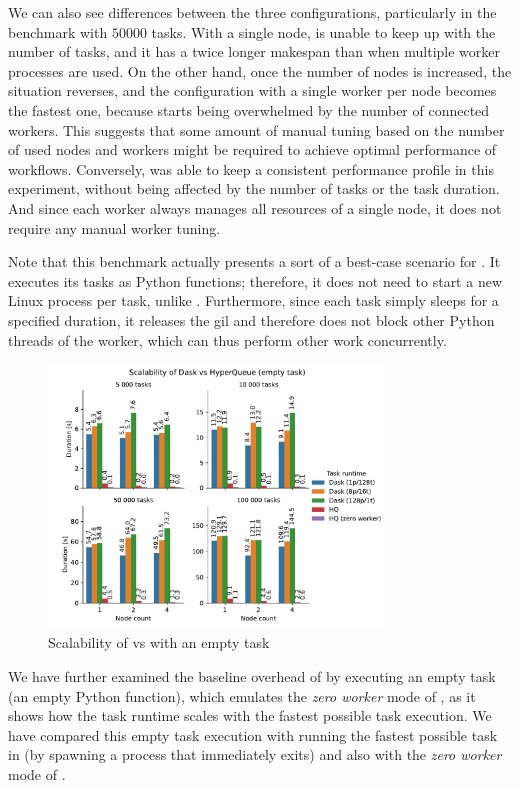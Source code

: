 We can also see differences between the three \dask{} configurations, particularly
in the benchmark with $50000$ tasks. With a single node, \dask{} is
unable to keep up with the number of tasks, and it has a twice longer makespan than when multiple
worker processes are used. On the other hand, once the number of nodes is increased, the situation
reverses, and the configuration with a single worker per node becomes the fastest one, because
\dask{} starts being overwhelmed by the number of connected workers. This suggests
that some amount of manual tuning based on the number of used nodes and workers might be required
to achieve optimal performance of \dask{} workflows. Conversely,
\hyperqueue{} was able to keep a consistent performance profile in this experiment,
without being affected by the number of tasks or the task duration. And since each
\hq{} worker always manages all resources of a single node, it does not require
any manual worker tuning.

Note that this benchmark actually presents a sort of a best-case scenario for
\dask{}. It executes its tasks as Python functions; therefore, it does not need to
start a new Linux process per task, unlike \hyperqueue{}. Furthermore, since each task
simply sleeps for a specified duration, it releases the \gls{gil} and therefore does
not block other Python threads of the worker, which can thus perform other work concurrently.

\begin{figure}[h]
	\centering
	\includegraphics[width=0.8\textwidth]{imgs/hq/charts/dask-vs-hq-empty}
	\caption{Scalability of \hyperqueue{} vs \dask{} with an empty task}
	\label{fig:hq-dask-empty}
\end{figure}

We have further examined the baseline overhead of \dask{} by executing an empty
task (an empty Python function), which emulates the \emph{zero worker} mode of
\hyperqueue{}, as it shows how the task runtime scales with the fastest possible task
execution. We have compared this empty task execution with running the fastest possible task in
\hyperqueue{} (by spawning a process that immediately exits) and also with the \emph{zero worker} mode of \hyperqueue{}.

